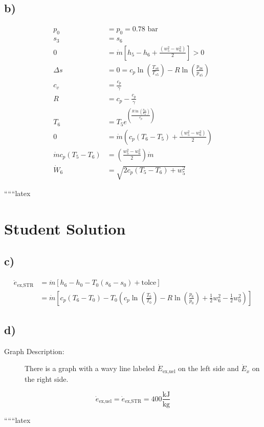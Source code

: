 \subsection*{b)}

\begin{align*}
    p_0 &= p_0 = 0.78 \text{ bar} \\
    s_3 &= s_6 \\
    0 &= \dot{m} \left[ h_5 - h_6 + \frac{(w_5^2 - w_6^2)}{2} \right] > 0 \\
    \Delta s &= 0 = c_p \ln \left( \frac{T_{s6}}{T_{s5}} \right) - R \ln \left( \frac{p_{26}}{p_{45}} \right) \\
    c_v &= \frac{c_p}{\gamma} \\
    R &= c_p - \frac{c_p}{\gamma} \\
    T_6 &= T_5 e^{\left( \frac{R \ln \left( \frac{p_{06}}{p_{45}} \right)}{c_p} \right)} \\
    0 &= \dot{m} \left( c_p (T_6 - T_5) + \frac{(w_5^2 - w_6^2)}{2} \right) \\
    \dot{m} c_p (T_5 - T_6) &= \left( \frac{w_5^2 - w_6^2}{2} \right) \dot{m} \\
    \dot{W}_6 &= \sqrt{2 c_p (T_5 - T_6) + w_5^2}
\end{align*}

``````latex

\section*{Student Solution}

\subsection*{c)}

\begin{align*}
\dot{e}_{\text{ex,STR}} &= \dot{m} \left[ h_{6} - h_{0} - T_{0} \left( s_{6} - s_{0} \right) + \text{tolce} \right] \\
&= \dot{m} \left[ c_{p} \left( T_{6} - T_{0} \right) - T_{0} \left( c_{p} \ln \left( \frac{T_{6}}{T_{0}} \right) - R \ln \left( \frac{p_{6}}{p_{0}} \right) + \frac{1}{2} w_{6}^{2} - \frac{1}{2} w_{0}^{2} \right) \right]
\end{align*}

\subsection*{d)}

\begin{description}
    \item[Graph Description:] There is a graph with a wavy line labeled \( \dot{E}_{\text{ex,uel}} \) on the left side and \( \dot{E}_{x} \) on the right side.
\end{description}

\[
\dot{e}_{\text{ex,uel}} = \dot{e}_{\text{ex,STR}} = 400 \frac{\text{kJ}}{\text{kg}}
\]

``````latex


